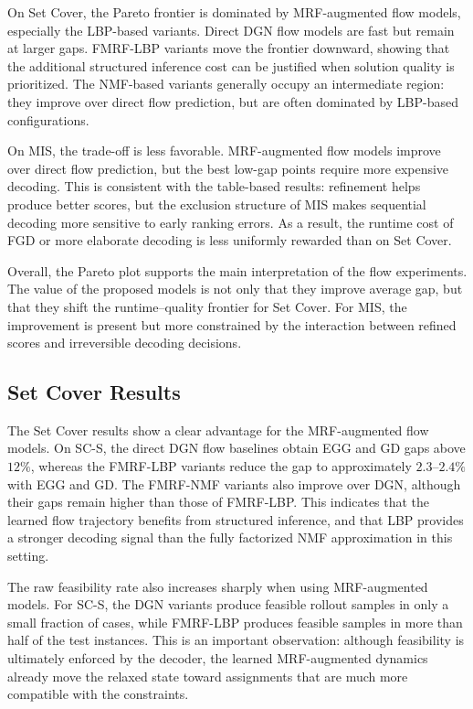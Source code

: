 On Set Cover, the Pareto frontier is dominated by MRF-augmented flow models, especially the LBP-based variants. Direct DGN flow models are fast but remain at larger gaps. FMRF-LBP variants move the frontier downward, showing that the additional structured inference cost can be justified when solution quality is prioritized. The NMF-based variants generally occupy an intermediate region: they improve over direct flow prediction, but are often dominated by LBP-based configurations.

On MIS, the trade-off is less favorable. MRF-augmented flow models improve over direct flow prediction, but the best low-gap points require more expensive decoding. This is consistent with the table-based results: refinement helps produce better scores, but the exclusion structure of MIS makes sequential decoding more sensitive to early ranking errors. As a result, the runtime cost of FGD or more elaborate decoding is less uniformly rewarded than on Set Cover.

Overall, the Pareto plot supports the main interpretation of the flow experiments. The value of the proposed models is not only that they improve average gap, but that they shift the runtime--quality frontier for Set Cover. For MIS, the improvement is present but more constrained by the interaction between refined scores and irreversible decoding decisions.

\subsection{Set Cover Results}

The Set Cover results show a clear advantage for the MRF-augmented flow models. On SC-S, the direct DGN flow baselines obtain EGG and GD gaps above $12\%$, whereas the FMRF-LBP variants reduce the gap to approximately $2.3$--$2.4\%$ with EGG and GD. The FMRF-NMF variants also improve over DGN, although their gaps remain higher than those of FMRF-LBP. This indicates that the learned flow trajectory benefits from structured inference, and that LBP provides a stronger decoding signal than the fully factorized NMF approximation in this setting.

The raw feasibility rate also increases sharply when using MRF-augmented models. For SC-S, the DGN variants produce feasible rollout samples in only a small fraction of cases, while FMRF-LBP produces feasible samples in more than half of the test instances. This is an important observation: although feasibility is ultimately enforced by the decoder, the learned MRF-augmented dynamics already move the relaxed state toward assignments that are much more compatible with the constraints.

